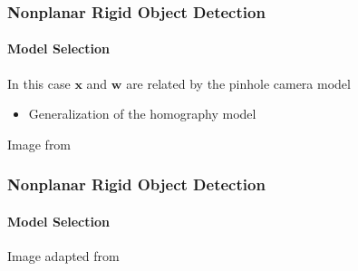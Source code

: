 \documentclass[xetex,professionalfont]{beamer}
\renewcommand{\vec}[1]{\ensuremath{\mathbf{#1}}}
\newcommand{\vw}{\vec{w}}
\newcommand{\vx}{\vec{x}}
\renewcommand\emph[1]{\textcolor{tuwcvl_inf_red}{#1}}
\begin{document}
\begin{frame}
\frametitle{Nonplanar Rigid Object Detection}
\framesubtitle{Model Selection}

In this case $\vx$ and $\vw$ are related by the \emph{pinhole camera model}
\begin{itemize}
    \item Generalization of the homography model %
\end{itemize}

\medskip
\begin{center}
    {\centering Image from \cite{szeliski2010}}
\end{center}

\end{frame}


\begin{frame}
\frametitle{Nonplanar Rigid Object Detection}
\framesubtitle{Model Selection}

\begin{center}
    {\centering Image adapted from \cite{prince12}}
\end{center}

\end{frame}
\end{document}
